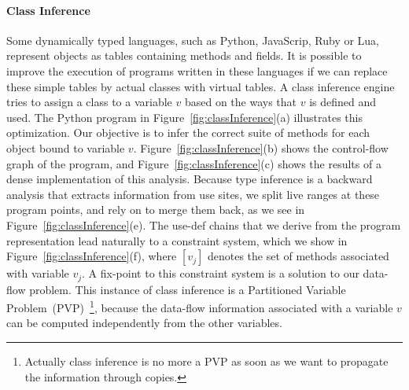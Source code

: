 \paragraph{Class Inference} Some dynamically typed languages, such as Python, Java\-Scrip, Ruby or Lua, represent objects as tables containing methods and fields.
It is possible to improve the execution of programs written in these languages if we can replace these simple tables by actual classes with virtual tables.
A class inference engine tries to assign a class to a variable $v$ based on the ways that $v$ is defined and used.
The Python program in Figure~\ref{fig:classInference}(a) illustrates this optimization.
Our objective is to infer the correct suite of methods for each object bound to variable $v$.
Figure~\ref{fig:classInference}(b) shows the control-flow graph of the program, and Figure~\ref{fig:classInference}(c) shows the results of a dense implementation of this analysis.
Because type inference is a backward analysis that extracts information from use sites, we split live ranges at these program points, and rely on \sigmafuns to merge them back, as we see in Figure~\ref{fig:classInference}(e).
The use-def chains that we derive from the program representation lead naturally to a constraint system, which we show in Figure~\ref{fig:classInference}(f), where $[v_j]$ denotes the set of methods associated with variable $v_j$.
A fix-point to this constraint system is a solution to our data-flow problem.
This instance of class inference is a Partitioned Variable Problem~(PVP)~\footnote{Actually class inference is no more a PVP as soon as we want to propagate the information through copies.}, because the data-flow information associated with a variable $v$ can be computed independently from the other variables.

